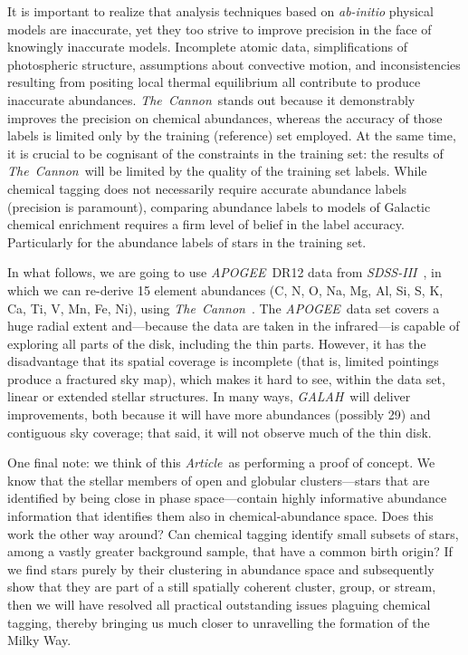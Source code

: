 \documentclass[manuscript, letterpaper]{aastex6}
\newcommand{\acronym}[1]{{\small{#1}}}
\newcommand{\project}[1]{\textsl{#1}}
\newcommand{\sdssiii}{\project{\acronym{SDSS-III}}}
\newcommand{\apogee}{\project{\acronym{APOGEE}}}
\newcommand{\galah}{\project{\acronym{GALAH}}}
\newcommand{\thecannon}{\project{The~Cannon}}
\newcommand{\foreign}[1]{\textsl{#1}}
\newcommand{\documentname}{\textsl{Article}}
\begin{document}
It is important to realize that analysis techniques based on \foreign{ab-initio}
physical models are inaccurate, yet they too strive to improve precision
in the face of knowingly inaccurate models.  Incomplete atomic data, 
simplifications of photospheric structure, assumptions about convective
motion, and inconsistencies resulting from positing local thermal
equilibrium all contribute to produce inaccurate abundances.
\thecannon\ stands out because it demonstrably improves the precision on
chemical abundances, whereas the accuracy of those labels is limited only
by the training (reference) set employed.  At the same time, it is crucial
to be cognisant of the constraints in the training set: the
results of \thecannon\ will be limited by the quality of the training 
set labels. While chemical tagging does not necessarily require
accurate abundance labels (precision is paramount), comparing abundance
labels to models of Galactic chemical enrichment requires a firm level
of belief in the label accuracy. Particularly for the abundance labels
of stars in the training set.
    
In what follows, we are going to use \apogee\ \acronym{DR12}
data \citep{apogeedr12, dr12}
from \sdssiii\ \citep{sdssiii}, in
which we can re-derive 15 element abundances (C, N, O, Na, Mg, Al, Si,
S, K, Ca, Ti, V, Mn, Fe, Ni), using \thecannon\ \citep{thecannon}.
The \apogee\ data set covers a huge radial extent and---because the
data are taken in the infrared---is capable of exploring all parts of the disk,
including the thin parts.
However, it has the disadvantage that its spatial coverage is incomplete
(that is, limited pointings produce a fractured sky map),
which makes it hard to see, within the data set, linear or
extended stellar structures.
In many ways, \galah\ will deliver improvements, both because it will
have more abundances (possibly 29) and contiguous sky coverage; that
said, it will not observe much of the thin disk.

One final note:
we think of this \documentname\ as performing a proof of concept.
We know that the stellar members of open and globular clusters---stars
that are identified by being close in phase space---contain highly
informative abundance information that identifies them also in
chemical-abundance space.  Does this work the other way around? 
Can chemical tagging identify small subsets of stars, among a vastly
greater background sample, that have a common birth origin? If we 
find stars purely by their clustering in abundance space and subsequently
show that they are part of a still spatially coherent cluster, group, or stream, then
we will have resolved all practical outstanding issues plaguing 
chemical tagging, thereby bringing us much closer to
unravelling the formation of the Milky Way.
\end{document}
